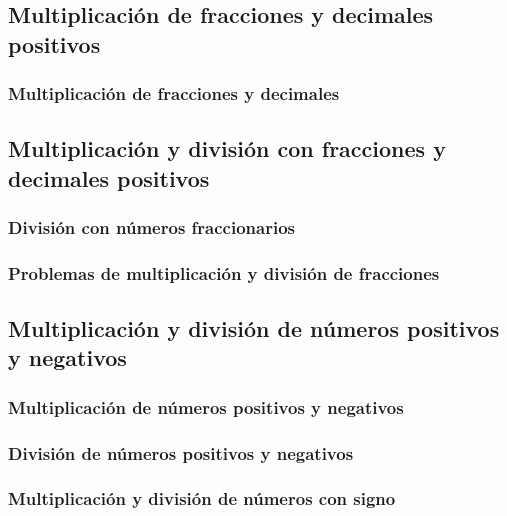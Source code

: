 \documentclass[11pt]{book}
\begin{document}
\pagestyle{empty}

\restoregeometry
{}
\tableofcontents
\chapter{}
\pagestyle{fancy}
\newpage
\thispagestyle{plain}
\section{Multiplicación de fracciones y decimales positivos}
\subsection{Multiplicación de fracciones y decimales}

\newpage
\thispagestyle{plain}
\section{Multiplicación y división con fracciones y decimales positivos}
\subsection{División con números fraccionarios}
\subsection{Problemas de multiplicación y división de fracciones}

\newpage \thispagestyle{plain}
\section{Multiplicación y división de números positivos y negativos}
\subsection{Multiplicación de números positivos y negativos}
\subsection{División de números positivos y negativos}
\subsection{Multiplicación y división de números con signo}

\newpage \thispagestyle{plain}
\end{document}
